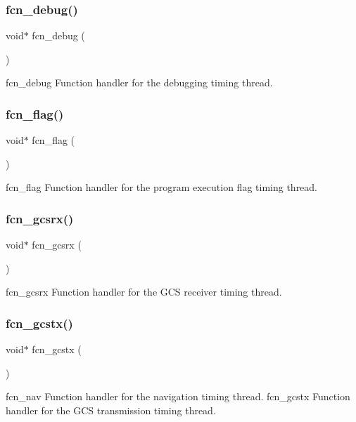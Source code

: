 \subsubsection{fcn\+\_\+debug()}
{\footnotesize\ttfamily void$\ast$ fcn\+\_\+debug (\begin{DoxyParamCaption}{ }\end{DoxyParamCaption})}

fcn\+\_\+debug Function handler for the debugging timing thread. \mbox{\label{timer_8h_a1de21361a80b4a8cc73ac302a159ac8b}} 
\subsubsection{fcn\+\_\+flag()}
{\footnotesize\ttfamily void$\ast$ fcn\+\_\+flag (\begin{DoxyParamCaption}{ }\end{DoxyParamCaption})}

fcn\+\_\+flag Function handler for the program execution flag timing thread. \mbox{\label{timer_8h_a2e92663e16d4e92eb336c377906b8b2d}} 
\subsubsection{fcn\+\_\+gcsrx()}
{\footnotesize\ttfamily void$\ast$ fcn\+\_\+gcsrx (\begin{DoxyParamCaption}{ }\end{DoxyParamCaption})}

fcn\+\_\+gcsrx Function handler for the G\+CS receiver timing thread. \mbox{\label{timer_8h_a11ad44a945d1b874c1c0abe895a86eea}} 
\subsubsection{fcn\+\_\+gcstx()}
{\footnotesize\ttfamily void$\ast$ fcn\+\_\+gcstx (\begin{DoxyParamCaption}{ }\end{DoxyParamCaption})}

fcn\+\_\+nav Function handler for the navigation timing thread. fcn\+\_\+gcstx Function handler for the G\+CS transmission timing thread. \mbox{\label{timer_8h_a428bfc3b3423ed672ccc7ff5f3a9349f}} 
